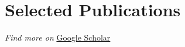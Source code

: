 \section*{Selected Publications}



\nocite{*}
\printbibliography[heading=none, title={}]

\smallskip
\textit{Find more on} \href{https://scholar.google.com/citations?user=C11Za-sAAAAJ&hl=en&oi=ao}{Google Scholar}
